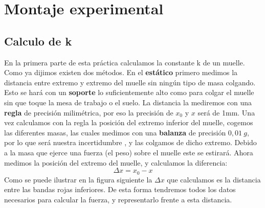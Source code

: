 \documentclass[12pt,a4paper]{book}
\begin{document}
\section{Montaje experimental}
\subsection{Calculo de k}
En la primera parte de esta práctica calculamos la constante k de un muelle. Como ya dijimos existen dos métodos. En el \textbf{estático} primero medimos la distancia entre extremo y extremo del muelle sin ningún tipo de masa colgando. Esto se hará con un \textbf{soporte} lo suficientemente alto como para colgar el muelle sin que toque la mesa de trabajo o el suelo. La distancia la mediremos con una \textbf{regla} de precisión milimétrica, por eso la precisión de $x_0$ y $x$ será de 1mm. Una vez calculamos con la regla la posición del extremo inferior del muelle, cogemos las diferentes masas, las cuales medimos con una \textbf{balanza} de precisión $0,01 \ g$, por lo que será nuestra incertidumbre , y las colgamos de dicho extremo. Debido a la masa que ejerce una fuerza (el peso) sobre el muelle este se estirará. Ahora medimos la posición del extremo del muelle, y calculamos la diferencia:
\begin{equation}
\Delta x = x_0-x
\label{Ec: muelle diferencia de x}
\end{equation}
Como se puede ilustrar en la figura siguiente la $\Delta x$ que calculamos es la distancia entre las bandas rojas inferiores. De esta forma tendremos todos los datos necesarios para calcular la fuerza, y representarlo frente a esta distancia.  \\
\end{document}
